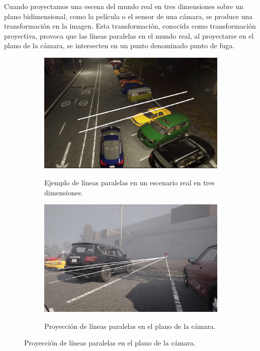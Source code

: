 \noindent
Cuando proyectamos una escena del mundo real en tres dimensiones sobre un plano bidimensional, como la película o el sensor de una cámara, se produce una transformación en la imagen.
Esta transformación, conocida como transformación proyectiva, provoca que las líneas paralelas en el mundo real, al proyectarse en el plano de la cámara, se intersecten en un punto denominado punto de fuga.

\begin{figure}[!ht]
    \centering
    \begin{subfigure}{0.4\textwidth}
        \includegraphics[width=\textwidth]{img/reticule/paralel_lines}\label{fig:parallel_lines}
        \caption{Ejemplo de líneas paralelas en un escenario real en tres dimensiones.}
    \end{subfigure}
    \begin{subfigure}{0.4\textwidth}
        \includegraphics[width=\textwidth]{img/reticule/pov}\label{fig:pov}
        \caption{Proyección de líneas paralelas en el plano de la cámara.}
    \end{subfigure}

    \label{fig:distorion}
\end{figure}

